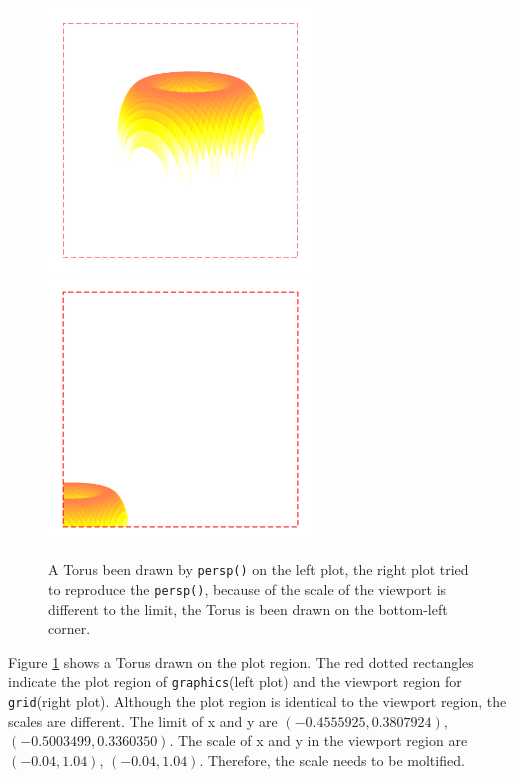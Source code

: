 \documentclass[paper=a4, fontsize=11pt]{report}
\begin{document}
\begin{figure}[h]
\begin{center}
  \includegraphics[height = 7cm, width = 7cm]{figure/gridGraphics_persp_demo_viewport_1.pdf}
  \includegraphics[height = 7cm, width = 7cm]{figure/gridGraphics_persp_demo_viewport_2.pdf}
  \caption{A Torus been drawn by \texttt{persp()} on the left plot, the right plot tried to reproduce the \texttt{persp()}, because of the scale of the viewport is different to the limit, the Torus is been drawn on the bottom-left corner.}
  	\label{figure_4.3}
\end{center}
\end{figure}

Figure \ref{figure_4.3} shows a Torus drawn on the plot region. The red dotted rectangles indicate the plot region of \texttt{graphics}(left plot) and the viewport region for \texttt{grid}(right plot). Although the plot region is identical to the viewport region, the scales are different. The limit of x and y are $(-0.4555925,  0.3807924)$, $(-0.5003499,  0.3360350)$. The scale of x and y in the viewport region are $(-0.04,  1.04)$, $(-0.04,  1.04)$. Therefore, the scale needs to be moltified. \\
\end{document}
